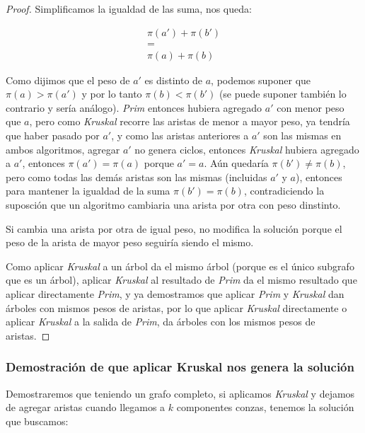 \begin{proof}
Simplificamos la igualdad de las suma, nos queda:

	\begin{equation*}
	\begin{split}
		\pi(a') + \pi(b') \\
		=\\
		\pi(a) + \pi(b)
	\end{split}
	\end{equation*}

	Como dijimos que el peso de $a'$ es distinto de $a$, podemos suponer que $\pi(a) > \pi(a')$ y por lo tanto $\pi(b) < \pi(b')$ (se puede suponer tambi\'en lo contrario y ser\'ia an\'alogo). \emph{Prim} entonces hubiera agregado $a'$ con menor peso que $a$, pero como \emph{Kruskal} recorre las aristas de menor a mayor peso, ya tendr\'ia que haber pasado por $a'$, y como las aristas anteriores a $a'$ son las mismas en ambos algoritmos, agregar $a'$ no genera ciclos, entonces \emph{Kruskal} hubiera agregado a $a'$, entonces $\pi(a') = \pi(a)$ porque $a' = a$. A\'un quedar\'ia $\pi(b') \neq \pi(b)$, pero como todas las dem\'as aristas son las mismas (incluidas $a'$ y $a$), entonces para mantener la igualdad de la suma $\pi(b') = \pi(b)$, contradiciendo la suposci\'on que un algoritmo cambiaria una arista por otra con peso dinstinto.

	Si cambia una arista por otra de igual peso, no modifica la soluci\'on porque el peso de la arista de mayor peso seguir\'ia siendo el mismo.

	Como aplicar \emph{Kruskal} a un \'arbol da el mismo \'arbol (porque es el \'unico subgrafo que es un \'arbol), aplicar \emph{Kruskal} al resultado de \emph{Prim} da el mismo resultado que aplicar directamente \emph{Prim}, y ya demostramos que aplicar \emph{Prim} y \emph{Kruskal} dan \'arboles con mismos pesos de aristas, por lo que aplicar \emph{Kruskal} directamente o aplicar \emph{Kruskal} a la salida de \emph{Prim}, da \'arboles con los mismos pesos de aristas.

\end{proof}

\subsubsection{Demostraci\'on de que aplicar Kruskal nos genera la soluci\'on} \label{ej_2:demo:p}

Demostraremos que teniendo un grafo completo, si aplicamos \emph{Kruskal} y dejamos de agregar aristas cuando llegamos a $k$ componentes conzas, tenemos la soluci\'on que buscamos:

